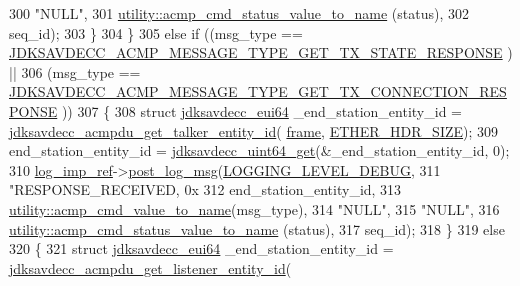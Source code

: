\begin{DoxyCode}
{{300                                       \textcolor{stringliteral}{"NULL"},
301                                       \hyperlink{namespaceavdecc__lib_1_1utility_a997ca93009ef89352844dec17b15719f}{utility::acmp\_cmd\_status\_value\_to\_name}
      (status),
302                                       seq\_id);
303         \}
304     \}
305     \textcolor{keywordflow}{else} \textcolor{keywordflow}{if} ((msg\_type == \hyperlink{group__acmp__message__type_gaf9b24b0190d5bf9cae7e37c4a31cda12}{JDKSAVDECC\_ACMP\_MESSAGE\_TYPE\_GET\_TX\_STATE\_RESPONSE}
      ) ||
306              (msg\_type == 
      \hyperlink{group__acmp__message__type_gac8d2fee5822f733200680da98472958f}{JDKSAVDECC\_ACMP\_MESSAGE\_TYPE\_GET\_TX\_CONNECTION\_RESPONSE}
      ))
307     \{
308         \textcolor{keyword}{struct }\hyperlink{structjdksavdecc__eui64}{jdksavdecc\_eui64} \_end\_station\_entity\_id = 
      \hyperlink{group__acmpdu_ga9efe0b94b146760a8849d872d2a00da7}{jdksavdecc\_acmpdu\_get\_talker\_entity\_id}(
      \hyperlink{gst__avb__playbin_8c_ac8e710e0b5e994c0545d75d69868c6f0}{frame}, \hyperlink{namespaceavdecc__lib_a6c827b1a0d973e18119c5e3da518e65ca9512ad9b34302ba7048d88197e0a2dc0}{ETHER\_HDR\_SIZE});
309         end\_station\_entity\_id = \hyperlink{group__endian_gac8c2b48b7d7db101708e0197e366ac42}{jdksavdecc\_uint64\_get}(&\_end\_station\_entity\_id, 0);
310         \hyperlink{namespaceavdecc__lib_acbe3e2a96ae6524943ca532c87a28529}{log\_imp\_ref}->\hyperlink{classavdecc__lib_1_1log_a68139a6297697e4ccebf36ccfd02e44a}{post\_log\_msg}(\hyperlink{namespaceavdecc__lib_a501055c431e6872ef46f252ad13f85cdae3138c2a0a71a6404155ff912e450406}{LOGGING\_LEVEL\_DEBUG},
311                                   \textcolor{stringliteral}{"RESPONSE\_RECEIVED, 0x%
312                                   end\_station\_entity\_id,
313                                   \hyperlink{namespaceavdecc__lib_1_1utility_a89e861257b12dded819c0e1966cbb798}{utility::acmp\_cmd\_value\_to\_name}(msg\_type),
314                                   \textcolor{stringliteral}{"NULL"},
315                                   \textcolor{stringliteral}{"NULL"},
316                                   \hyperlink{namespaceavdecc__lib_1_1utility_a997ca93009ef89352844dec17b15719f}{utility::acmp\_cmd\_status\_value\_to\_name}
      (status),
317                                   seq\_id);
318     \}
319     \textcolor{keywordflow}{else}
320     \{
321         \textcolor{keyword}{struct }\hyperlink{structjdksavdecc__eui64}{jdksavdecc\_eui64} \_end\_station\_entity\_id = 
      \hyperlink{group__acmpdu_ga138eb586d71333fa5c27c226373c771f}{jdksavdecc\_acmpdu\_get\_listener\_entity\_id}(
}}}
\end{DoxyCode}
